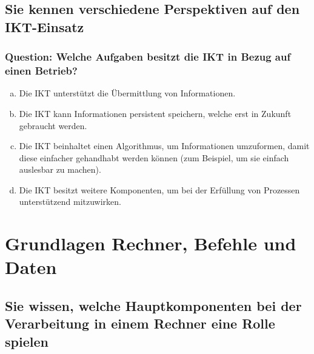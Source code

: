 \documentclass{article}
\begin{document}
\begin{adjustwidth}{2em}{2em}
\begin{adjustwidth}{2em}{2em}
			\subsection{Sie kennen verschiedene Perspektiven auf den IKT-Einsatz}
			\begin{adjustwidth}{1em}{}
				\subsubsection*{Question: Welche Aufgaben besitzt die IKT in Bezug auf einen Betrieb?}
				\begin{adjustwidth}{1em}{}
					\begin{enumerate}[(a)]
						\item Die IKT unterstützt die Übermittlung von Informationen.
						\item Die IKT kann Informationen persistent speichern, welche erst in Zukunft gebraucht werden.
						\item Die IKT beinhaltet einen Algorithmus, um Informationen umzuformen, damit diese einfacher gehandhabt werden können (zum Beispiel, um sie einfach auslesbar zu machen).
						\item Die IKT besitzt weitere Komponenten, um bei der Erfüllung von Prozessen unterstützend mitzuwirken.
					\end{enumerate}
				\end{adjustwidth}
			\end{adjustwidth}
		\end{adjustwidth}
		
		\section{Grundlagen Rechner, Befehle und Daten}
		\begin{adjustwidth}{2em}{2em}
			\subsection{Sie wissen, welche Hauptkomponenten bei der Verarbeitung in einem Rechner eine Rolle spielen}
			\begin{adjustwidth}{1em}{}

\end{adjustwidth}
\end{adjustwidth}
\end{adjustwidth}
\end{document}
